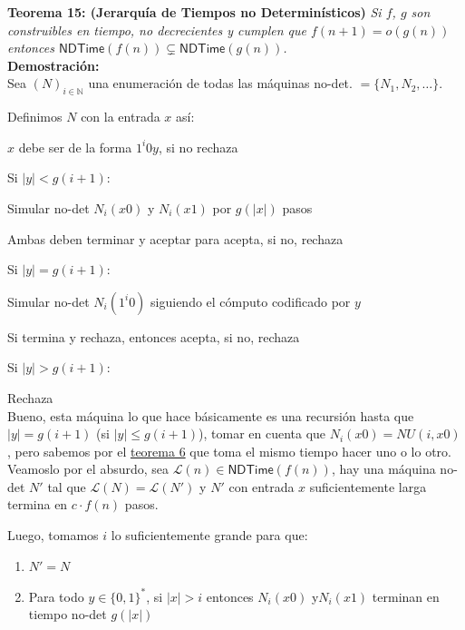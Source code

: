 \documentclass{article}
\begin{document}
\begin{flushleft}
  \textbf{Teorema 15: \hypertarget{jerTnodet}{\textcolor{Bittersweet}{(Jerarquía de Tiempos no Determinísticos)}}}
  \textit{Si $f$, $g$ son construibles en tiempo, no decrecientes y cumplen que $f(n + 1) = o(g(n))$ entonces 
  $\mathsf{NDTime}(f(n)) \subsetneq \mathsf{NDTime}(g(n))$.} \\[0.5em]

  \textbf{\textcolor{Mulberry}{Demostración:}} \\[0.5em]

  Sea $(N)_{i \in \mathbb{N}}$ una enumeración de todas las máquinas no-det. $= \{N_1, N_2, \dots\}$.

  Definimos $N$ con la entrada $x$ así:

  \quad $x$ debe ser de la forma $1^i 0 y$, si no \textcolor{OliveGreen}{rechaza}

  \quad Si $|y| < g(i+1)$:

    \qquad Simular no-det $N_i(x0)$ y $N_i(x1)$ por $g(|x|)$ pasos
    
    \qquad Ambas deben terminar y aceptar para \textcolor{OliveGreen}{acepta}, si no, \textcolor{OliveGreen}
    {rechaza}
  
  \quad Si $|y| = g(i+1)$:

    \qquad Simular no-det $N_i(1^i0)$ siguiendo el cómputo codificado por $y$

    \qquad Si termina y rechaza, entonces \textcolor{OliveGreen}{acepta}, si no, \textcolor{OliveGreen}{rechaza}

  \quad Si $|y| > g(i+1)$:

    \qquad \textcolor{OliveGreen}{Rechaza}
  \\[0.5em]

  Bueno, esta máquina lo que hace básicamente es una recursión hasta que $|y| = g(i+1)$ (si $|y| \leq g(i+1)$),
  tomar en cuenta que $N_i(x0) = NU(i, x0)$, pero sabemos por el \textcolor{Rhodamine}{\hyperlink{teo6}{teorema 6}}
  que toma el mismo tiempo hacer uno o lo otro. \\[0.5em]

  Veamoslo por el absurdo, sea $\mathcal{L}(n) \in \mathsf{NDTime}(f(n))$, hay una máquina no-det $N'$ tal que 
  $\mathcal{L}(N) = \mathcal{L}(N')$ y $N'$ con entrada $x$ suficientemente larga termina en $c \cdot f(n)$ pasos.
  
  Luego, tomamos $i$ lo suficientemente grande para que:
\end{flushleft}
\begin{enumerate}
  \item $N' = N$
  \item Para todo $y \in \{0,1\}^*$, si $|x| > i$ entonces $N_i(x0)$ y$N_i(x1)$ terminan en tiempo no-det $g(|x|)$
\end{enumerate}
\end{document}
